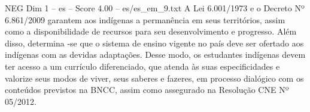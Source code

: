 \begin{textsample}{NEG Dim 1 – es – Score 4.00 – es/es\_em\_9.txt}
A Lei 6.001/1973 e o Decreto Nº 6.861/2009 garantem aos indígenas a permanência em seus territórios, assim como a disponibilidade de recursos para seu desenvolvimento e progresso.
Além disso, determina -se que o sistema de ensino vigente no país deve ser ofertado aos indígenas com as devidas adaptações.
Desse modo, os estudantes indígenas devem ter acesso a um currículo diferenciado, que atenda às suas especificidades e valorize seus modos de viver, seus saberes e fazeres, em processo dialógico com os conteúdos previstos na BNCC, assim como assegurado na Resolução CNE Nº 05/2012.

\end{textsample}
